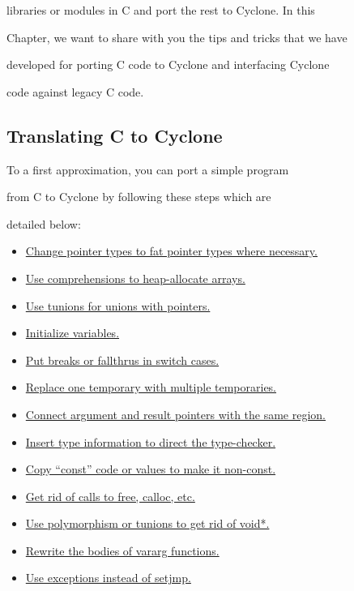 libraries or modules in C and port the rest to Cyclone.  In this


Chapter, we want to share with you the tips and tricks that we have


developed for porting C code to Cyclone and interfacing Cyclone


code against legacy C code.





\subsection{Translating C to Cyclone}





To a first approximation, you can port a simple program


from C to Cyclone by following these steps which are


detailed below:


\begin{itemize}


\item \hyperlink{port:pointers}{Change pointer types to fat pointer types where necessary.}  


\item \hyperlink{port:malloc}{Use comprehensions to heap-allocate arrays.}


\item \hyperlink{port:unions}{Use tunions for unions with pointers.}


\item \hyperlink{port:initialize}{Initialize variables.}  


\item \hyperlink{port:cases}{Put breaks or fallthrus in switch cases.} 


\item \hyperlink{port:temp}{Replace one temporary with multiple temporaries.}  


\item \hyperlink{port:rgns}{Connect argument and result pointers with the same region.}


\item \hyperlink{port:types}{Insert type information to direct the type-checker.}


\item \hyperlink{port:const}{Copy ``const'' code or values to make it non-const.}  


\item \hyperlink{port:free}{Get rid of calls to free, calloc, etc.}


\item \hyperlink{port:poly}{Use polymorphism or tunions to get rid of void*.}  


\item \hyperlink{port:vararg}{Rewrite the bodies of vararg functions.}


\item \hyperlink{port:setjmp}{Use exceptions instead of setjmp.}


\end{itemize}





